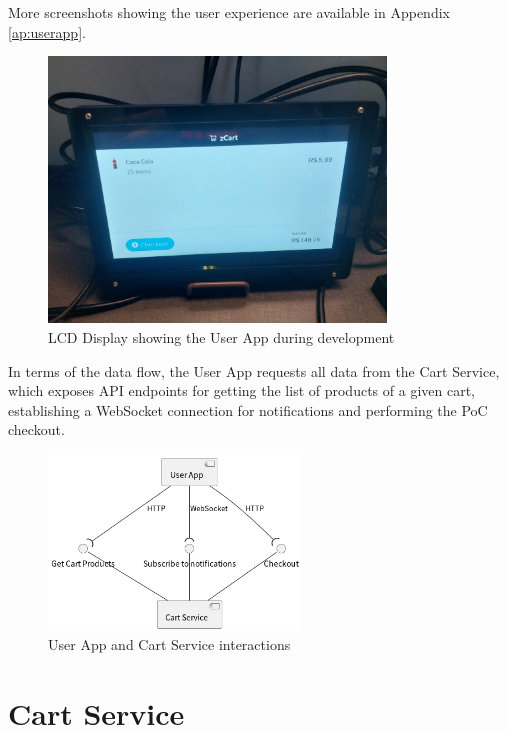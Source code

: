 \documentclass[openright]{normas-utf-tex} %
\begin{document}
More screenshots showing the user experience are available in Appendix \ref{ap:userapp}.

\begin{figure}[H]
	\centering
	\includegraphics[width=0.8\textwidth]{./images/lcddisplay.jpeg}
	\caption[LCD Display showing the User App during development]{LCD Display showing the User App during development}
	\label{fig:dummy}
\end{figure}

In terms of the data flow, the User App requests all data from the Cart Service, which exposes API endpoints for
getting the list of products of a given cart, establishing a WebSocket connection for notifications and performing
the PoC checkout.

\begin{figure}[H]
	\centering
	\includegraphics[width=0.6\textwidth]{./images/diagrams/UserApp.png}
	\caption[User App and Cart Service interactions]{User App and Cart Service interactions}
	\label{fig:dummy}
\end{figure}

\section{Cart Service}
\end{document}
